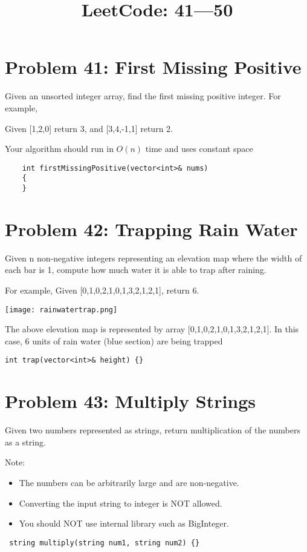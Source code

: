 \documentclass[12pt,a4paper]{article}
\begin{document}
	\title{LeetCode: 41---50}
	\maketitle
	\section*{Problem 41: First Missing Positive}
	Given an unsorted integer array, find the first missing positive integer.
	For example,
	\par
	Given [1,2,0] return 3,
	and [3,4,-1,1] return 2.
	\noindent
	\par
	Your algorithm should run in $O(n)$ time and uses constant space
	
	\begin{lstlisting}
    int firstMissingPositive(vector<int>& nums) 
    {
    }
	\end{lstlisting}
	
\section*{Problem 42: Trapping Rain Water}
Given n non-negative integers representing an elevation map where the width of each bar is 1, compute how much water it is able to trap after raining.
\par
For example, 
Given [0,1,0,2,1,0,1,3,2,1,2,1], return 6.
\begin{center}
	\texttt{[image: rainwatertrap.png]}
\end{center}
The above elevation map is represented by array [0,1,0,2,1,0,1,3,2,1,2,1]. In this case, 6 units of rain water (blue section) are being trapped
\begin{lstlisting}
int trap(vector<int>& height) {}
\end{lstlisting}

\section*{Problem 43: Multiply Strings}
Given two numbers represented as strings, return multiplication of the numbers as a string.
\par
Note:
\begin{itemize}
	\item The numbers can be arbitrarily large and are non-negative.
	\item Converting the input string to integer is NOT allowed.
	\item You should NOT use internal library such as BigInteger.
\end{itemize}
\begin{lstlisting}
 string multiply(string num1, string num2) {}
\end{lstlisting}
\end{document}

